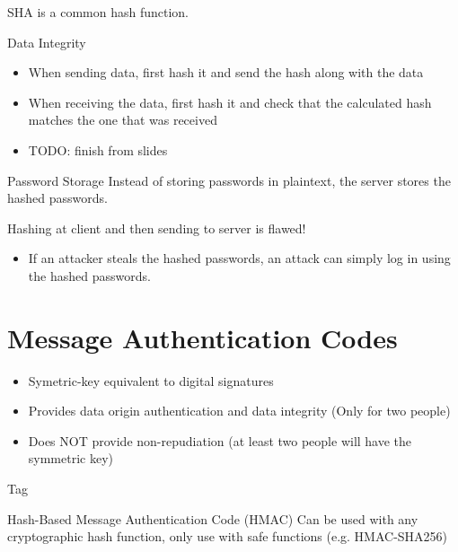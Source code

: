 \documentclass[12pt]{report}
\begin{document}
\begin{dfnbox}{SHA}{}
     is a common hash function.
\end{dfnbox}

\begin{exbox}{Data Integrity}{}
    \begin{itemize}
        \item When sending data, first hash it and send the hash along with the data
        \item When receiving the data, first hash it and check that the calculated hash matches the one that was received
        \item TODO: finish from slides
    \end{itemize}
\end{exbox}

\begin{exbox}{Password Storage}{}
    Instead of storing passwords in plaintext, the server stores the hashed passwords.

    Hashing at client and then sending to server is flawed!
    \begin{itemize}
        \item If an attacker steals the hashed passwords, an attack can simply log in using the hashed passwords.
    \end{itemize}
\end{exbox}

\section{Message Authentication Codes}
\begin{itemize}
    \item Symetric-key equivalent to digital signatures
    \item Provides data origin authentication and data integrity (Only for two people)
    \item Does NOT provide non-repudiation (at least two people will have the symmetric key)
\end{itemize}

\begin{dfnbox}{Tag}{}

\end{dfnbox}

\begin{dfnbox}{Hash-Based Message Authentication Code (HMAC)}{}
    Can be used with any cryptographic hash function, only use with safe functions (e.g. HMAC-SHA256)
\end{dfnbox}
\end{document}
